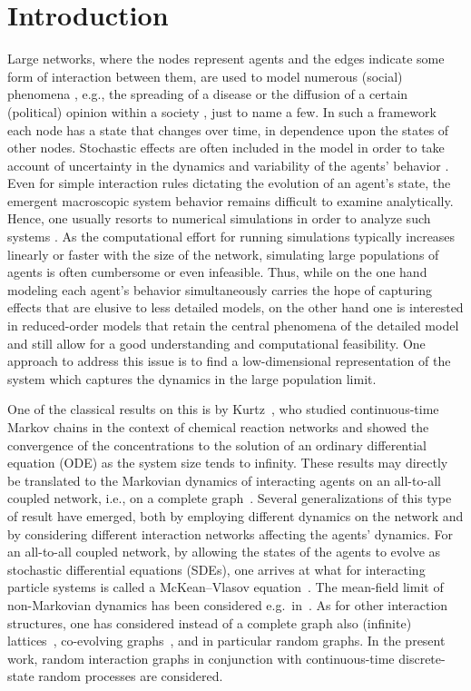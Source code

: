 \documentclass[a4paper,
               10pt,
               pdftex,
               normalheadings,
               headsepline,
               footsepline,
               headinclude,
               footinclude,
               DIV=14,
               abstracton]
{scrartcl}
\begin{document}
\section{Introduction}
Large networks, where the nodes represent agents and the edges indicate some form of interaction between them, are used to model numerous (social) phenomena \cite{Easley2010, Castellano2009}, e.g., the spreading of a disease \cite{Kiss2017} or the diffusion of a certain (political) opinion within a society \cite{das2014}, just to name a few.
In such a framework each node has a state that changes over time, in dependence upon the states of other nodes.
Stochastic effects are often included in the model in order to take account of uncertainty in the dynamics and variability of the agents' behavior \cite{Castellano2009}.  Even for simple interaction rules dictating the evolution of an agent's state, the emergent macroscopic system behavior remains difficult to examine analytically. Hence, one usually resorts to numerical simulations in order to analyze such systems \cite{Porter2016}.
As the computational effort for running simulations typically increases linearly or faster with the size of the network, simulating large populations of agents is often cumbersome or even infeasible. 
Thus, while on the one hand modeling each agent’s behavior simultaneously carries the hope of capturing effects that are elusive to less detailed models, on the other hand one is interested in reduced-order models that retain the central phenomena of the detailed model and still allow for a good understanding and computational feasibility.
One approach to address this issue is to find a low-dimensional representation of the system which captures the dynamics in the large population limit.

One of the classical results on this is by Kurtz~\cite{Kurtz1978}, who studied continuous-time Markov chains in the context of chemical reaction networks and showed the convergence of the concentrations to the solution of an ordinary differential equation (ODE) as the system size tends to infinity. These results may directly be translated to the Markovian dynamics of interacting agents on an all-to-all coupled network, i.e., on a complete graph~\cite{Niemann2021}. 
Several generalizations of this type of result have emerged, both by employing different dynamics on the network and by considering different interaction networks affecting the agents' dynamics. For an all-to-all coupled network, by allowing the states of the agents to evolve as stochastic differential equations (SDEs), one arrives at what for interacting particle systems is called a McKean--Vlasov equation~\cite{kolokoltsov2010nonlinear}. The mean-field limit of non-Markovian dynamics has been considered e.g.\ in~\cite{duong2018mean,GaRa22}.
As for other interaction structures, one has considered instead of a complete graph also (infinite) lattices~\cite{presutti1983hydrodynamics}, co-evolving graphs~\cite{gkogkas2022graphop}, and in particular random graphs. In the present work, random interaction graphs in conjunction with continuous-time discrete-state random processes are considered.
\end{document}
